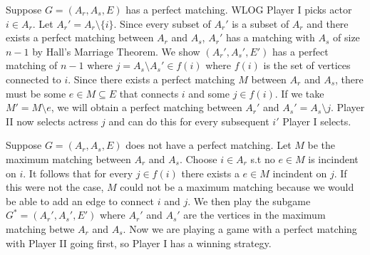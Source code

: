 \documentclass[10pt]{article}[H]
\begin{document}
\begin{itemize}
    Suppose $G=(A_r,A_s,E)$ has a perfect matching.
    WLOG Player I picks actor $i\in A_r$. 
    Let $A_r'=A_r\setminus\{i\}$.
    Since every subset of $A_r'$ is a subset of $A_r$ and there exists a perfect matching between $A_r$ and $A_s$, $A_r'$ has a matching with $A_s$ of size $n-1$ by Hall's Marriage Theorem.
    We show $(A_r',A_s',E')$ has a perfect matching of $n-1$ where $j=A_s\setminus A_s'\in f(i)$ where $f(i)$ is the set of vertices connected to $i$. 
    Since there exists a perfect matching $M$ between $A_r$ and $A_s$, there must be some $e\in M\subseteq E$ that connects $i$ and some $j\in f(i)$. If we take $M'=M\setminus e$, we will obtain a perfect matching between $A_r'$ and $A_s'=A_s\setminus j$. 
    Player II now selects actress $j$ and can do this for every subsequent $i'$ Player I selects.

    Suppose $G=(A_r,A_s,E)$ does not have a perfect matching. Let $M$ be the maximum matching between $A_r$ and $A_s$.
    Choose $i\in A_r$ s.t no $e\in M$ is incindent on $i$. It follows that for every $j\in f(i)$ there exists a $e\in M$ incindent on $j$. If this were not the case, $M$ could not be a maximum matching because we would be able to add an edge to connect $i$ and $j$.
    We then play the subgame $G^*=(A_r',A_s',E')$ where $A_r'$ and $A_s'$ are the vertices in the maximum matching betwe $A_r$ and $A_s$. 
    Now we are playing a game with a perfect matching with Player II going first, so Player I has a winning strategy.
\end{itemize}
\end{document}
